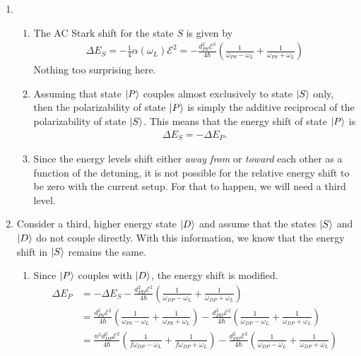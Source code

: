 \documentclass{article}
\theoremstyle{definition}
\newcommand{\al}{\alpha}
\newcommand{\f}[2]{\frac{#1}{#2}}
\newcommand{\lp}{\left(}
\newcommand{\rp}{\right)}
\begin{document}
\begin{enumerate}[label=(\alph*)]
	\item 
	
	\begin{enumerate}[label=(\roman*)]
		\item The AC Stark shift for the state $S$ is given by 
		\begin{align*}
			\Delta E_S = -\f{1}{4}\al(\omega_L) \mathcal{E}^2 = -\f{d_{PS}^2\mathcal{E}^2}{4\hbar}\lp \f{1}{\omega_{PS} - \omega_L} + \f{1}{\omega_{PS} + \omega_L} \rp
		\end{align*}
		Nothing too surprising here.
		
		\item Assuming that state $\ket{P}$ couples almost exclusively to state $\ket{S}$ only, then the polarizability of state $\ket{P}$ is simply the additive reciprocal of the polarizability of state $\ket{S}$. This means that the energy shift of state $\ket{P}$ is 
		\begin{align*}
		\Delta E_S = -\Delta E_P.
		\end{align*}
		
		\item Since the energy levels shift either \textit{away from} or \textit{toward} each other as a function of the detuning, it is not possible for the relative energy shift to be zero with the current setup. For that to happen, we will need a third level.
	\end{enumerate}
	
	\item Consider a third, higher energy state $\ket{D}$ and assume that the states $\ket{S}$ and $\ket{D}$ do not couple directly. With this information, we know that the energy shift in $\ket{S}$ remains the same. 
	
	\begin{enumerate}[label=(\roman*)]
		\item Since $\ket{P}$ couples with $\ket{D}$, the energy shift is modified. 
		\begin{align*}
		\Delta E_P &= -\Delta E_S -\f{d_{PD}^2 \mathcal{E}^2}{4\hbar}\lp \f{1}{\omega_{DP} - \omega_L} + \f{1}{\omega_{DP} + \omega_L} \rp\\
		&= \f{d_{PS}^2\mathcal{E}^2}{4\hbar}\lp \f{1}{\omega_{PS} - \omega_L} + \f{1}{\omega_{PS} + \omega_L} \rp -\f{d_{PD}^2 \mathcal{E}^2}{4\hbar}\lp \f{1}{\omega_{DP} - \omega_L} + \f{1}{\omega_{DP} + \omega_L} \rp\\
		&= \f{n^2d_{DP}^2\mathcal{E}^2}{4\hbar}\lp \f{1}{f\omega_{DP} - \omega_L} + \f{1}{f\omega_{DP} + \omega_L} \rp -\f{d_{PD}^2 \mathcal{E}^2}{4\hbar}\lp \f{1}{\omega_{DP} - \omega_L} + \f{1}{\omega_{DP} + \omega_L} \rp\\
		\end{align*}
		

\end{enumerate}
\end{enumerate}
\end{document}
